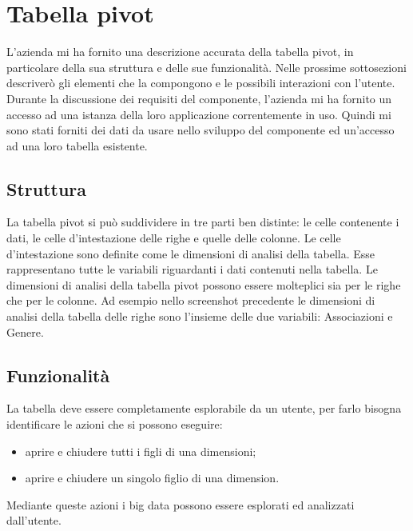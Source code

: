 \section{Tabella pivot}
L'azienda mi ha fornito una descrizione accurata della tabella pivot, in particolare della sua struttura e delle sue funzionalità. Nelle prossime sottosezioni descriverò gli elementi che la compongono e le possibili interazioni con l'utente. Durante la discussione dei requisiti del componente, l'azienda mi ha fornito un accesso ad una istanza della loro applicazione correntemente in uso. Quindi mi sono stati forniti dei dati da usare nello sviluppo del componente ed un'accesso ad una loro tabella esistente.
\begin{minipage}{\linewidth}
\end{minipage}

\subsection{Struttura}
La tabella pivot si può suddividere in tre parti ben distinte: le celle contenente i dati, le celle d'intestazione delle righe e quelle delle colonne. 
Le celle d'intestazione sono definite come le dimensioni di analisi della tabella. Esse rappresentano tutte le variabili riguardanti i dati contenuti nella tabella. Le dimensioni di analisi della tabella pivot possono essere molteplici sia per le righe che per le colonne. Ad esempio nello screenshot precedente le dimensioni di analisi della tabella delle righe sono l'insieme delle due variabili: Associazioni e Genere.

\subsection{Funzionalità}
La tabella deve essere completamente esplorabile da un utente, per farlo bisogna identificare le azioni che si possono eseguire:
\begin{itemize}
	\item aprire e chiudere tutti i figli di una dimensioni;
	\item aprire e chiudere un singolo figlio di una dimension.
\end{itemize}
Mediante queste azioni i big data possono essere esplorati ed analizzati dall'utente.

